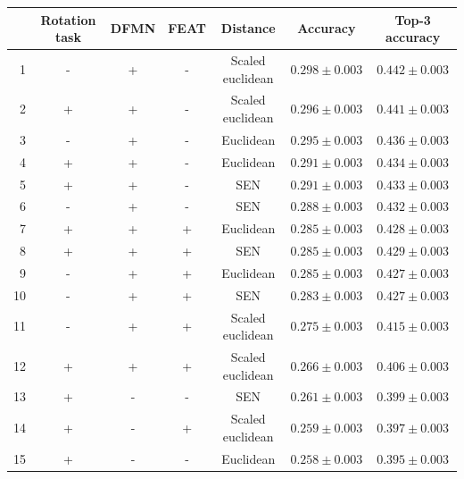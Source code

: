 \documentclass[a4paper, 12pt]{report}
\begin{document}
 \begin{table}[h!]
\begin{adjustbox}{center}
\begin{tabular}{| r | c c c c | c |  c | }
\hline
    & Rotation task   & DFMN   & FEAT   & Distance         & Accuracy         & Top-3 accuracy   \\
    \hline
  1 & -               & +      & -      & Scaled euclidean & $0.298 \pm 0.003$ & $0.442 \pm 0.003$ \\
    \hline
  2 & +               & +      & -      & Scaled euclidean & $0.296 \pm 0.003$ & $0.441 \pm 0.003$ \\
    \hline
  3 & -               & +      & -      & Euclidean        & $0.295 \pm 0.003$ & $0.436 \pm 0.003$ \\
    \hline
  4 & +               & +      & -      & Euclidean        & $0.291 \pm 0.003$ & $0.434 \pm 0.003$ \\
    \hline
  5 & +               & +      & -      & SEN              & $0.291 \pm 0.003$ & $0.433 \pm 0.003$ \\
    \hline
  6 & -               & +      & -      & SEN              & $0.288 \pm 0.003$ & $0.432 \pm 0.003$ \\
    \hline
  7 & +               & +      & +      & Euclidean        & $0.285 \pm 0.003$ & $0.428 \pm 0.003$ \\
    \hline
  8 & +               & +      & +      & SEN              & $0.285 \pm 0.003$ & $0.429 \pm 0.003$ \\
    \hline
  9 & -               & +      & +      & Euclidean        & $0.285 \pm 0.003$ & $0.427 \pm 0.003$ \\
    \hline
 10 & -               & +      & +      & SEN              & $0.283 \pm 0.003$ & $0.427 \pm 0.003$ \\
    \hline
 11 & -               & +      & +      & Scaled euclidean & $0.275 \pm 0.003$ & $0.415 \pm 0.003$ \\
    \hline
 12 & +               & +      & +      & Scaled euclidean & $0.266 \pm 0.003$ & $0.406 \pm 0.003$ \\
    \hline
 13 & +               & -      & -      & SEN              & $0.261 \pm 0.003$ & $0.399 \pm 0.003$ \\
    \hline
 14 & +               & -      & +      & Scaled euclidean & $0.259 \pm 0.003$ & $0.397 \pm 0.003$ \\
    \hline
 15 & +               & -      & -      & Euclidean        & $0.258 \pm 0.003$ & $0.395 \pm 0.003$ \\

\end{tabular}
\end{adjustbox}
\end{table}
\end{document}
